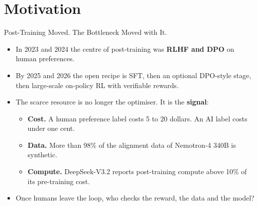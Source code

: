 \section{Motivation}

\begin{frame}{Post-Training Moved. The Bottleneck Moved with It.}
    \begin{itemize}\itemsep0.35em
        \item In 2023 and 2024 the centre of post-training was \textbf{RLHF and DPO} on human preferences.
        \item By 2025 and 2026 the open recipe is SFT, then an optional DPO-style stage, then \alert{large-scale on-policy RL with verifiable rewards}.
        \item The scarce resource is no longer the optimiser. It is the \textbf{signal}:
        \begin{itemize}\itemsep0.3em
            \item \textbf{Cost.} A human preference label costs 5 to 20 dollars. An AI label costs under one cent.
            \item \textbf{Data.} More than 98\% of the alignment data of Nemotron-4 340B is synthetic.
            \item \textbf{Compute.} DeepSeek-V3.2 reports post-training compute above 10\% of its pre-training cost.
        \end{itemize}
        \item Once humans leave the loop, who checks the reward, the data and the model?
    \end{itemize}
    \vspace{0.3em}
\end{frame}


